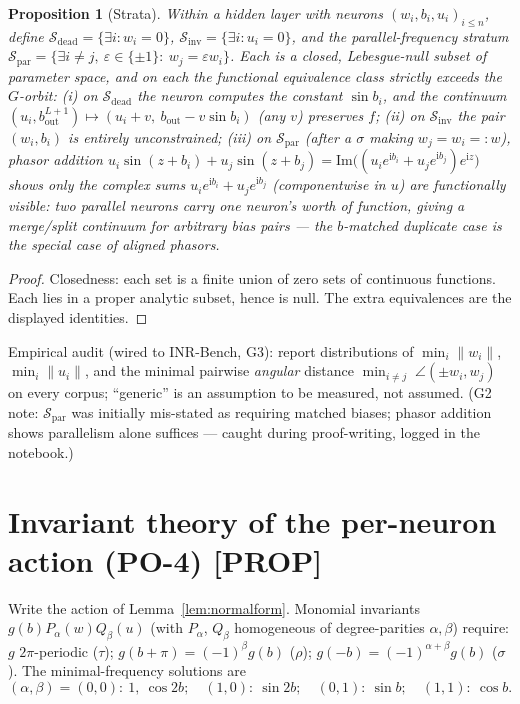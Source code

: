 \documentclass[11pt]{article}
\newtheorem{proposition}[theorem]{Proposition}
\begin{document}
\begin{proposition}[Strata]\label{prop:po3}
Within a hidden layer with neurons $(w_i,b_i,u_i)_{i\le n}$, define
$\mathcal S_{\mathrm{dead}}=\{\exists i: w_i=0\}$,
$\mathcal S_{\mathrm{inv}}=\{\exists i: u_i=0\}$, and the \emph{parallel-frequency} stratum
$\mathcal S_{\mathrm{par}}=\{\exists i\ne j,\ \varepsilon\in\{\pm1\}:\ w_j=\varepsilon w_i\}$.
Each is a closed, Lebesgue-null subset of parameter space, and on each the functional equivalence
class strictly exceeds the $G$-orbit:
(i) on $\mathcal S_{\mathrm{dead}}$ the neuron computes the constant $\sin b_i$, and the continuum
$(u_i,b^{L+1}_{\mathrm{out}})\mapsto(u_i+v,\ b_{\mathrm{out}}-v\sin b_i)$ (any $v$) preserves $f$;
(ii) on $\mathcal S_{\mathrm{inv}}$ the pair $(w_i,b_i)$ is entirely unconstrained;
(iii) on $\mathcal S_{\mathrm{par}}$ (after a $\sigma$ making $w_j=w_i=:w$), \emph{phasor
addition} $u_i\sin(z+b_i)+u_j\sin(z+b_j)=\mathrm{Im}\big((u_ie^{\mathrm i b_i}+u_je^{\mathrm i
b_j})e^{\mathrm i z}\big)$ shows only the complex sums $u_ie^{\mathrm i b_i}+u_je^{\mathrm i b_j}$
(componentwise in $u$) are functionally visible: two parallel neurons carry one neuron's worth of
function, giving a merge/split continuum for \emph{arbitrary} bias pairs — the $b$-matched
duplicate case is the special case of aligned phasors.
\end{proposition}

\begin{proof}
Closedness: each set is a finite union of zero sets of continuous functions. Each lies in a proper
analytic subset, hence is null. The extra equivalences are the displayed identities.
\end{proof}

Empirical audit (wired to INR-Bench, G3): report distributions of $\min_i\|w_i\|$,
$\min_i\|u_i\|$, and the minimal pairwise \emph{angular} distance
$\min_{i\ne j}\;\angle(\pm w_i,w_j)$ on every corpus; ``generic'' is an assumption to be measured,
not assumed. (G2 note: $\mathcal S_{\mathrm{par}}$ was initially mis-stated as requiring matched
biases; phasor addition shows parallelism alone suffices — caught during proof-writing, logged in
the notebook.)

\section{Invariant theory of the per-neuron action (PO-4) [PROP]}

Write the action of Lemma~\ref{lem:normalform}. Monomial invariants $g(b)P_\alpha(w)Q_\beta(u)$
(with $P_\alpha$, $Q_\beta$ homogeneous of degree-parities $\alpha,\beta$) require:
$g$ $2\pi$-periodic ($\tau$); $g(b+\pi)=(-1)^\beta g(b)$ ($\rho$); $g(-b)=(-1)^{\alpha+\beta}g(b)$
($\sigma$). The minimal-frequency solutions are
\[
(\alpha,\beta)=(0,0):\ 1,\ \cos 2b;\quad (1,0):\ \sin 2b;\quad (0,1):\ \sin b;\quad (1,1):\ \cos b .
\]
\end{document}
